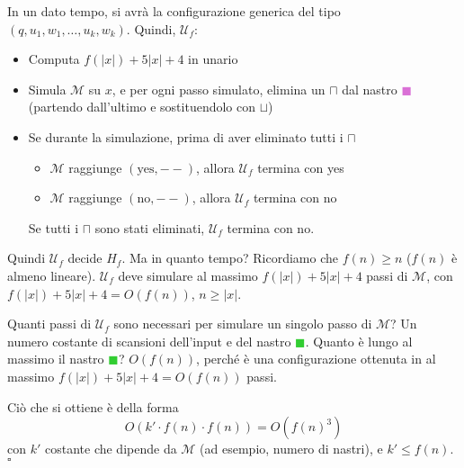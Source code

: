 \begin{center}
\end{center}
In un dato tempo, si avrà la configurazione generica del tipo $(q,u_1,w_1,\dots,u_k,w_k)$. Quindi, $\mathcal{U}_f$:
\begin{itemize}
    \item Computa $f(|x|)+5|x|+4$ in unario
    \item Simula $\mathcal{M}$ su $x$, e per ogni passo simulato, elimina un $\sqcap$ dal nastro \textcolor{Orchid}{$\blacksquare$} (partendo dall'ultimo e sostituendolo con $\sqcup$)
    \item Se durante la simulazione, prima di aver eliminato tutti i $\sqcap$
    \begin{itemize}
        \item $\mathcal{M}$ raggiunge $(\text{yes},--)$, allora $\mathcal{U}_f$ termina con yes 
        \item $\mathcal{M}$ raggiunge $(\text{no},--)$, allora $\mathcal{U}_f$ termina con no
    \end{itemize}
    Se tutti i $\sqcap$ sono stati eliminati, $\mathcal{U}_f$ termina con no.
\end{itemize}
Quindi $\mathcal{U}_f$ decide $H_f$. Ma in quanto tempo? Ricordiamo che $f(n)\geq n$ ($f(n)$ è almeno lineare). $\mathcal{U}_f$ deve simulare al massimo $f(|x|)+5|x|+4$ passi di $\mathcal{M}$, con $f(|x|)+5|x|+4=O(f(n))$, $n\geq|x|$.

Quanti passi di $\mathcal{U}_f$ sono necessari per simulare un singolo passo di $\mathcal{M}$? Un numero costante di scansioni dell'input e del nastro \textcolor{LimeGreen}{$\blacksquare$}.
Quanto è lungo al massimo il nastro \textcolor{LimeGreen}{$\blacksquare$}? $O(f(n))$, perché è una configurazione ottenuta in al massimo $f(|x|)+5|x|+4=O(f(n))$ passi.

Ciò che si ottiene è della forma 
$$
    O\left(k'\cdot f(n)\cdot f(n)\right) = O\left(f(n)^3\right)
$$
con $k'$ costante che dipende da $\mathcal{M}$ (ad esempio, numero di nastri), e $k'\leq f(n)$. \hfill $\square$\medskip

